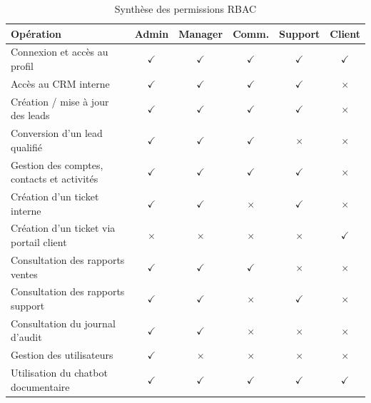 \begin{table}[H]
\centering
\footnotesize
\caption{Synthèse des permissions RBAC}
\label{tab:rbac}
\begin{tabularx}{\textwidth}{|X|c|c|c|c|c|}
\hline
\textbf{Opération} & \textbf{Admin} & \textbf{Manager} & \textbf{Comm.} & \textbf{Support} & \textbf{Client} \\
\hline
Connexion et accès au profil & $\checkmark$ & $\checkmark$ & $\checkmark$ & $\checkmark$ & $\checkmark$ \\
\hline
Accès au CRM interne & $\checkmark$ & $\checkmark$ & $\checkmark$ & $\checkmark$ & $\times$ \\
\hline
Création / mise à jour des leads & $\checkmark$ & $\checkmark$ & $\checkmark$ & $\checkmark$ & $\times$ \\
\hline
Conversion d'un lead qualifié & $\checkmark$ & $\checkmark$ & $\checkmark$ & $\times$ & $\times$ \\
\hline
Gestion des comptes, contacts et activités & $\checkmark$ & $\checkmark$ & $\checkmark$ & $\checkmark$ & $\times$ \\
\hline
Création d'un ticket interne & $\checkmark$ & $\checkmark$ & $\times$ & $\checkmark$ & $\times$ \\
\hline
Création d'un ticket via portail client & $\times$ & $\times$ & $\times$ & $\times$ & $\checkmark$ \\
\hline
Consultation des rapports ventes & $\checkmark$ & $\checkmark$ & $\checkmark$ & $\times$ & $\times$ \\
\hline
Consultation des rapports support & $\checkmark$ & $\checkmark$ & $\times$ & $\checkmark$ & $\times$ \\
\hline
Consultation du journal d'audit & $\checkmark$ & $\checkmark$ & $\times$ & $\times$ & $\times$ \\
\hline
Gestion des utilisateurs & $\checkmark$ & $\times$ & $\times$ & $\times$ & $\times$ \\
\hline
Utilisation du chatbot documentaire & $\checkmark$ & $\checkmark$ & $\checkmark$ & $\checkmark$ & $\checkmark$ \\
\hline
\end{tabularx}
\end{table}

